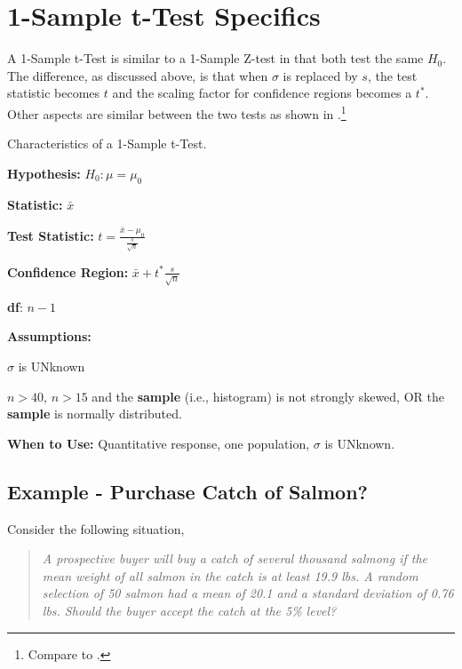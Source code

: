 \documentclass[10pt,openany]{book}\usepackage[]{graphicx}\usepackage[]{color}
\begin{document}
\vspace{-24pt}
\section{1-Sample t-Test Specifics} \label{sect:t1test}
\vspace{-12pt}
A 1-Sample t-Test is similar to a 1-Sample Z-test in that both test the same $H_{0}$.  The difference, as discussed above, is that when $\sigma$ is replaced by $s$, the test statistic becomes $t$ and the scaling factor for confidence regions becomes a $t^{*}$.  Other aspects are similar between the two tests as shown in .\footnote{Compare  to .}

\begin{table}[h]
\centering
\colorbox{ltgray}{
\begin{minipage}{.8\textwidth}
  \centering
	\caption{Characteristics of a 1-Sample t-Test.}\label{tab:1tspec}
  \begin{Itemize}
      \item \textbf{Hypothesis:} $H_{0}:\mu=\mu_{0}$
      \item \textbf{Statistic:} $\bar{x}$
      \vspace{6pt}
      \item \textbf{Test Statistic:} $t=\frac{\bar{x}-\mu_{0}}{\frac{s}{\sqrt{n}}}$
      \vspace{6pt}
      \item \textbf{Confidence Region:} $\bar{x}+t^{*}\frac{s}{\sqrt{n}}$
      \item \textbf{df}: $n-1$
      \item \textbf{Assumptions:}
        \begin{Enumerate}
          \item $\sigma$ is UNknown
          \item $n>40$, $n>15$ and the \textbf{sample} (i.e., histogram) is not strongly skewed, OR the \textbf{sample} is normally distributed.
        \end{Enumerate}
      \item \textbf{When to Use:} Quantitative response, one population, $\sigma$ is UNknown.
  \end{Itemize}
\end{minipage}}
\end{table}

\subsection{Example - Purchase Catch of Salmon?}
\vspace{-6pt}
Consider the following situation,
\vspace{-12pt}
\begin{quote}
\textsl{A prospective buyer will buy a catch of several thousand salmong if the mean weight of all salmon in the catch is at least 19.9 lbs.  A random selection of 50 salmon had a mean of 20.1 and a standard deviation of 0.76 lbs.  Should the buyer accept the catch at the 5\% level?}
\end{quote}
\end{document}
